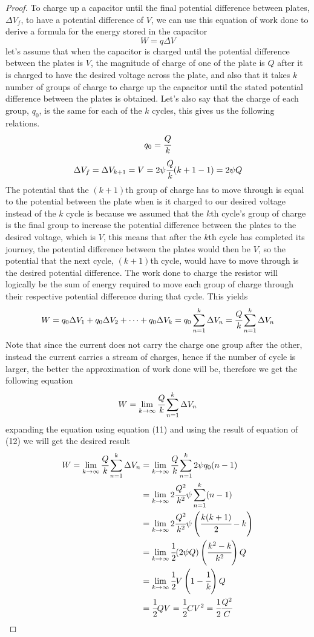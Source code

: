 \documentclass{article}
\begin{document}
\begin{proof}
To charge up a capacitor until the final potential difference between plates, $\Delta V_f$, to have a potential difference of $V$, we can use this equation of work done to derive a formula for the energy stored in the capacitor
$$W=q\Delta V$$
let's assume that when the capacitor is charged until the potential difference between the plates is $V$, the magnitude of charge of one of the plate is $Q$ after it is charged to have the desired voltage across the plate, and also that it takes $k$ number of groups of charge to charge up the capacitor until the stated potential difference between the plates is obtained. Let's also say that the charge of each group, $q_0$, is the same for each of the $k$ cycles, this gives us the following relations.
$$q_0=\cfrac{Q}{k}$$
\begin{equation}
    \Delta V_f=\Delta V_{k+1}=V=2\psi \cfrac{Q}{k} (k+1-1)=2\psi Q
\end{equation}
The potential that the $(k+1)$th group of charge has to move through is equal to the potential between the plate when is it charged to our desired voltage instead of the $k$ cycle is because we assumed that the $k$th cycle's group of charge is the final group to increase the potential difference between the plates to the  desired voltage, which is $V$, this means that after the $k$th cycle has completed its journey, the potential difference between the plates would then be $V$, so the potential that the next cycle, $(k+1)$th cycle, would have to move through is the desired potential difference. The work done to charge the resistor will logically be the sum of energy required to move each group of charge through their respective potential difference during that cycle. This yields 
$$W=q_0\Delta V_1+q_0\Delta V_2+\dots +q_0\Delta V_k=q_0\sum \limits_{n=1}^{k}\Delta V_n=\cfrac{Q}{k}\sum \limits_{n=1}^{k}\Delta V_n$$
Note that since the current does not carry the charge one group after the other, instead the current carries a stream of charges, hence if the number of cycle is larger, the better the approximation of work done will be, therefore we get the following equation
$$W=\lim _{k\rightarrow \infty}\cfrac{Q}{k}\sum \limits_{n=1}^{k}\Delta V_n$$
expanding the equation using equation (11) and using the result of equation of (12) we will get the desired result
\begin{align*}
    W=\lim _{k\rightarrow \infty}\cfrac{Q}{k}\sum \limits_{n=1}^{k}\Delta V_n&=\lim _{k\rightarrow \infty}\cfrac{Q}{k}\sum \limits_{n=1}^{k}2 \psi q_0 (n-1) \\ &=\lim _{k\rightarrow \infty} 2\cfrac{Q^2}{k^2}\psi \sum \limits_{n=1}^{k}(n-1)\\ &= \lim _{k\rightarrow \infty} 2\cfrac{Q^2}{k^2}\psi \left(\cfrac{k(k+1)}{2}-k\right) \\ &= \lim _{k\rightarrow \infty} \cfrac{1}{2}(2\psi Q)\left(\cfrac{k^2-k}{k^2} \right)Q\\ &= \lim _{k\rightarrow \infty} \cfrac{1}{2} V\left(1-\cfrac{1}{k}\right)Q \\ &= \cfrac{1}{2}QV=\cfrac{1}{2}CV^2=\cfrac{1}{2}\cfrac{Q^2}{C} 
\end{align*}
\end{proof}
\end{document}
